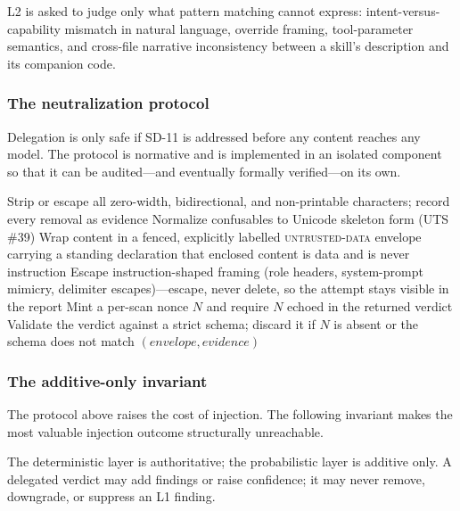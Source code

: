 \documentclass[11pt]{article}
\begin{document}
L2 is asked to judge only what pattern matching cannot express:
intent-versus-capability mismatch in natural language, override framing,
tool-parameter semantics, and cross-file narrative inconsistency between a
skill's description and its companion code.

\subsubsection{The neutralization protocol}
\label{sec:neutralize}

Delegation is only safe if SD-11 is addressed before any content reaches any
model. The protocol is normative and is implemented in an isolated component so
that it can be audited---and eventually formally verified---on its own.

\begin{algorithm}[htbp]
\caption{SD-11 neutralization protocol (normative)}
\label{alg:neutralize}
\begin{algorithmic}[1]
  \State Strip or escape all zero-width, bidirectional, and non-printable
         characters; record every removal as evidence
  \State Normalize confusables to Unicode skeleton form (UTS \#39)
  \State Wrap content in a fenced, explicitly labelled
         \textsc{untrusted-data} envelope carrying a standing declaration
         that enclosed content is data and is never instruction
  \State Escape instruction-shaped framing (role headers, system-prompt
         mimicry, delimiter escapes)---escape, never delete, so the attempt
         stays visible in the report
  \State Mint a per-scan nonce $N$ and require $N$ echoed in the returned
         verdict
  \State Validate the verdict against a strict schema; discard it if $N$ is
         absent or the schema does not match
  \State \Return $(envelope, evidence)$
\EndFunction
\end{algorithmic}
\end{algorithm}

\subsubsection{The additive-only invariant}
\label{sec:additive}

The protocol above raises the cost of injection. The following invariant makes
the most valuable injection outcome structurally unreachable.

\begin{tcolorbox}[title=\textbf{Additive-only invariant},
  colback=red!5,colframe=red!60!black]
The deterministic layer is authoritative; the probabilistic layer is additive
only. A delegated verdict may add findings or raise confidence; it may never
remove, downgrade, or suppress an L1 finding.
\end{tcolorbox}
\end{document}
